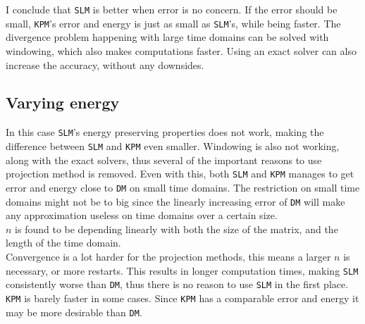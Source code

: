 I conclude that \texttt{SLM} is better when error is no concern. If the error should be small, \texttt{KPM}'s error and energy is just as small as \texttt{SLM}'s, while being faster. The divergence problem happening with large time domains can be solved with windowing, which also makes computations faster. Using an exact solver can also increase the accuracy, without any downsides.
\subsection{Varying energy} %
In this case \texttt{SLM}'s energy preserving properties does not work, making the difference between \texttt{SLM} and \texttt{KPM} even smaller. Windowing is also not working, along with the exact solvers, thus several of the important reasons to use projection method is removed. Even with this, both \texttt{SLM} and \texttt{KPM} manages to get error and energy close to \texttt{DM} on small time domains. The restriction on small time domains might not be to big since the linearly increasing error of \texttt{DM} will make any approximation useless on time domains over a certain size.\\

$n$ is found to be depending linearly with both the size of the matrix, and the length of the time domain.\\

Convergence is a lot harder for the projection methods, this means a larger $n$ is necessary, or more restarts. This results in longer computation times,
making \texttt{SLM} consistently worse than \texttt{DM}, thus there is no reason to use \texttt{SLM} in the first place. \texttt{KPM} is barely faster in some cases. Since \texttt{KPM} has a comparable error and energy it may be more desirable than \texttt{DM}.

%
%
